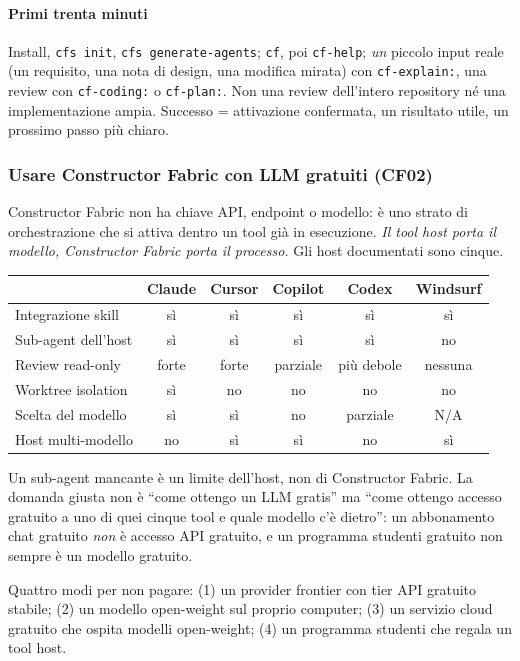 \documentclass[a4paper,12pt]{article}
\begin{document}
\paragraph{Primi trenta minuti} Install, \texttt{cfs init}, \texttt{cfs generate-agents};
\texttt{cf}, poi \texttt{cf-help}; \emph{un} piccolo input reale (un requisito, una nota di
design, una modifica mirata) con \texttt{cf-explain:}, una review con \texttt{cf-coding:}
o \texttt{cf-plan:}. Non una review dell'intero repository né una implementazione ampia.
Successo = attivazione confermata, un risultato utile, un prossimo passo più chiaro.

\subsubsection{Usare Constructor Fabric con LLM gratuiti (CF02)}

Constructor Fabric non ha chiave API, endpoint o modello: è uno strato di orchestrazione
che si attiva dentro un tool già in esecuzione. \emph{Il tool host porta il modello,
Constructor Fabric porta il processo.} Gli host documentati sono cinque.

\begin{center}
\begin{tabular}{|l|c|c|c|c|c|}
\hline
 & \textbf{Claude} & \textbf{Cursor} & \textbf{Copilot} & \textbf{Codex} & \textbf{Windsurf}\\
\hline
Integrazione skill & sì & sì & sì & sì & sì\\
Sub-agent dell'host & sì & sì & sì & sì & no\\
Review read-only & forte & forte & parziale & più debole & nessuna\\
Worktree isolation & sì & no & no & no & no\\
Scelta del modello & sì & sì & no & parziale & N/A\\
Host multi-modello & no & sì & sì & no & sì\\
\hline
\end{tabular}
\end{center}
Un sub-agent mancante è un limite dell'host, non di Constructor Fabric. La domanda giusta
non è ``come ottengo un LLM gratis'' ma ``come ottengo accesso gratuito a uno di quei
cinque tool e quale modello c'è dietro'': un abbonamento chat gratuito \emph{non} è accesso
API gratuito, e un programma studenti gratuito non sempre è un modello gratuito.

Quattro modi per non pagare: (1) un provider frontier con tier API gratuito stabile;
(2) un modello open-weight sul proprio computer; (3) un servizio cloud gratuito che ospita
modelli open-weight; (4) un programma studenti che regala un tool host.
\end{document}
